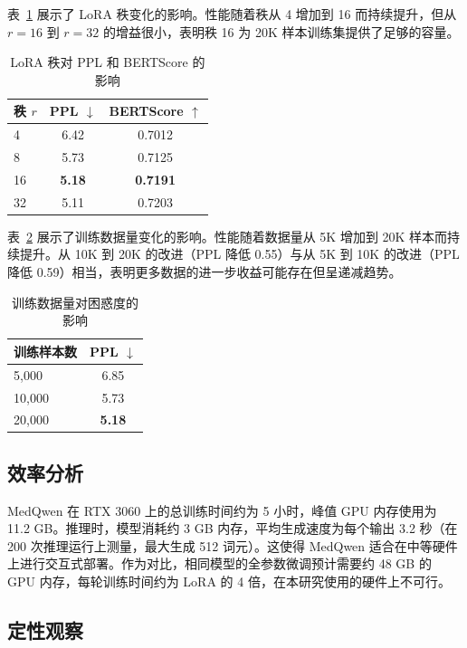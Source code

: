 \documentclass[12pt,a4paper]{article}
\begin{document}
表~\ref{tab:ablation_rank} 展示了 LoRA 秩变化的影响。性能随着秩从 4 增加到 16 而持续提升，但从 $r=16$ 到 $r=32$ 的增益很小，表明秩 16 为 20K 样本训练集提供了足够的容量。

\begin{table}[ht]
\centering
\caption{LoRA 秩对 PPL 和 BERTScore 的影响}
\label{tab:ablation_rank}
\begin{tabular}{lcc}
\toprule
\textbf{秩 $r$} & \textbf{PPL $\downarrow$} & \textbf{BERTScore $\uparrow$} \\
\midrule
4 & 6.42 & 0.7012 \\
8 & 5.73 & 0.7125 \\
16 & \textbf{5.18} & \textbf{0.7191} \\
32 & 5.11 & 0.7203 \\
\bottomrule
\end{tabular}
\end{table}

表~\ref{tab:ablation_data} 展示了训练数据量变化的影响。性能随着数据量从 5K 增加到 20K 样本而持续提升。从 10K 到 20K 的改进（PPL 降低 0.55）与从 5K 到 10K 的改进（PPL 降低 0.59）相当，表明更多数据的进一步收益可能存在但呈递减趋势。

\begin{table}[ht]
\centering
\caption{训练数据量对困惑度的影响}
\label{tab:ablation_data}
\begin{tabular}{lc}
\toprule
\textbf{训练样本数} & \textbf{PPL $\downarrow$} \\
\midrule
5,000  & 6.85 \\
10,000 & 5.73 \\
20,000 & \textbf{5.18} \\
\bottomrule
\end{tabular}
\end{table}

\subsection{效率分析}

MedQwen 在 RTX 3060 上的总训练时间约为 5 小时，峰值 GPU 内存使用为 11.2 GB。推理时，模型消耗约 3 GB 内存，平均生成速度为每个输出 3.2 秒（在 200 次推理运行上测量，最大生成 512 词元）。这使得 MedQwen 适合在中等硬件上进行交互式部署。作为对比，相同模型的全参数微调预计需要约 48 GB 的 GPU 内存，每轮训练时间约为 LoRA 的 4 倍，在本研究使用的硬件上不可行。

\subsection{定性观察}
\end{document}
